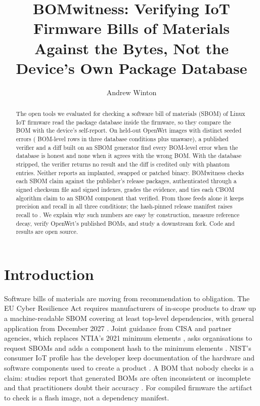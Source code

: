 \documentclass[sigconf,nonacm]{acmart}
\newcommand{\tool}{BOMwitness}
\begin{document}
\title{BOMwitness: Verifying IoT Firmware Bills of Materials Against the Bytes, Not the Device's Own Package Database}

\author{Andrew Winton}

\begin{abstract}
The open tools we evaluated for checking a software bill of materials (SBOM) of Linux IoT firmware read the package database inside the firmware, so they compare the BOM with the device's self-report. On \nHeldImages{} held-out OpenWrt images with \nDistinctErr{} distinct seeded errors (\nBomRows{} BOM-level rows in three database conditions plus \nUnawareCases{} unaware), a published verifier and a diff built on an SBOM generator find every BOM-level error when the database is honest and none when it agrees with the wrong BOM. With the database stripped, the verifier returns no result and the diff is credited only with phantom entries. Neither reports an implanted, swapped or patched binary. \tool{} checks each SBOM claim against the publisher's release packages, authenticated through a signed checksum file and signed indexes, grades the evidence, and ties each CBOM algorithm claim to an SBOM component that verified. From those feeds alone it keeps precision \pColFo{} and recall \rColFo{} in all three conditions; the hash-pinned release manifest raises recall to \rColNs{}. We explain why such numbers are easy by construction, measure reference decay, verify OpenWrt's published BOMs, and study a downstream fork. Code and results are open source.
\end{abstract}


\maketitle

\section{Introduction}

Software bills of materials are moving from recommendation to obligation. The EU Cyber Resilience Act requires manufacturers of in-scope products to draw up a machine-readable SBOM covering at least top-level dependencies, with general application from December 2027 \cite{cra2024}. Joint guidance from CISA and partner agencies, which replaces NTIA's 2021 minimum elements \cite{ntia2021minimum}, asks organisations to request SBOMs and adds a component hash to the minimum elements \cite{cisa2026minimum}. NIST's consumer IoT profile has the developer keep documentation of the hardware and software components used to create a product \cite{nistir8425}. A BOM that nobody checks is a claim: studies report that generated BOMs are often inconsistent or incomplete and that practitioners doubt their accuracy \cite{yu2024correctness,balliu2023challenges,xia2023empirical,stalnaker2024boms}. For compiled firmware the artifact to check is a flash image, not a dependency manifest.
\end{document}
